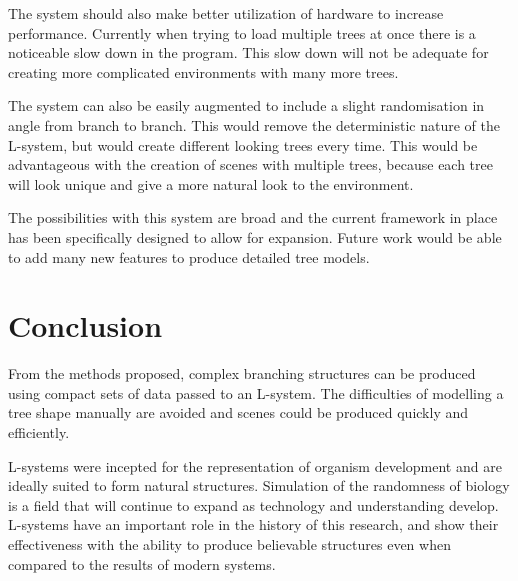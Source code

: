 \documentclass[final]{cmpreport}
\begin{document}
The system should also make better utilization of hardware to increase performance. Currently when 
trying to load multiple trees at once there is a noticeable slow down in the program. This slow down 
will not be adequate for creating more complicated environments with many more trees.

The system can also be easily augmented to include a slight randomisation in angle from branch to branch.
This would remove the deterministic nature of the L-system, but would create different looking trees 
every time. This would be advantageous with the creation of scenes with multiple trees, because each tree will 
look unique and give a more natural look to the environment.

The possibilities with this system are broad and the current framework in place has been 
specifically designed to allow for expansion. Future work would be able to add many new features to 
produce detailed tree models.

\section{Conclusion}
From the methods proposed, complex branching structures can be produced using compact sets of data 
passed to an L-system. The difficulties of modelling a tree shape manually are avoided and scenes 
could be produced quickly and efficiently.

L-systems were incepted for the representation of organism development and are ideally suited to 
form natural structures. Simulation of the randomness of biology is a field that will continue 
to expand as technology and understanding develop. L-systems have an important role in the history 
of this research, and show their effectiveness with the ability to produce believable structures 
even when compared to the results of modern systems. 

\pagebreak


\pagebreak
\end{document}
